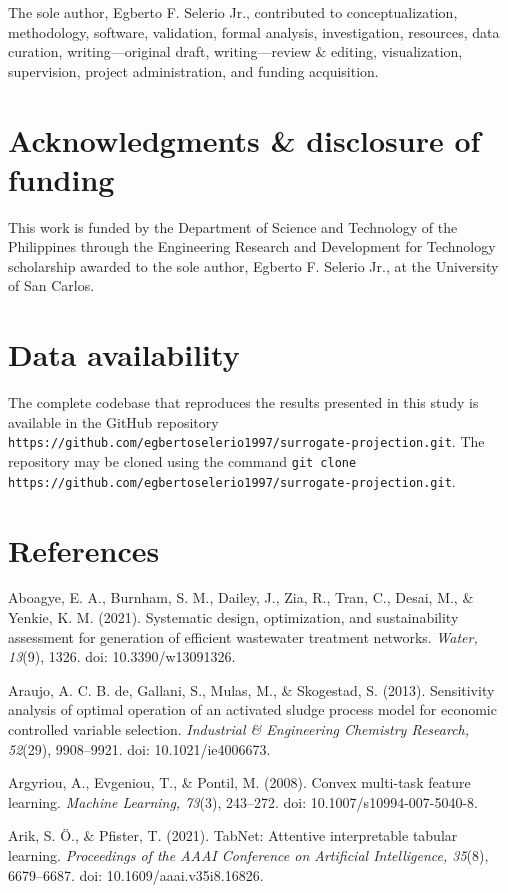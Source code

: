 \documentclass[a4paper,fleqn]{cas-sc}
\begin{document}
The sole author, Egberto F. Selerio Jr., contributed to conceptualization, methodology, software, validation, formal analysis, investigation, resources, data curation, writing---original draft, writing---review \& editing, visualization, supervision, project administration, and funding acquisition.

\section*{Acknowledgments \& disclosure of funding}

This work is funded by the Department of Science and Technology of the Philippines through the Engineering Research and Development for Technology scholarship awarded to the sole author, Egberto F. Selerio Jr., at the University of San Carlos.

\section*{Data availability}

The complete codebase that reproduces the results presented in this study is available in the GitHub repository \texttt{https://github.com/egbertoselerio1997/surrogate-projection.git}. The repository may be cloned using the command \texttt{git clone https://github.com/egbertoselerio1997/surrogate-projection.git}.

\section*{References}

\noindent Aboagye, E. A., Burnham, S. M., Dailey, J., Zia, R., Tran, C., Desai, M., \& Yenkie, K. M. (2021). Systematic design, optimization, and sustainability assessment for generation of efficient wastewater treatment networks. \textit{Water, 13}(9), 1326. doi: 10.3390/w13091326.

\noindent Araujo, A. C. B. de, Gallani, S., Mulas, M., \& Skogestad, S. (2013). Sensitivity analysis of optimal operation of an activated sludge process model for economic controlled variable selection. \textit{Industrial \& Engineering Chemistry Research, 52}(29), 9908--9921. doi: 10.1021/ie4006673.

\noindent Argyriou, A., Evgeniou, T., \& Pontil, M. (2008). Convex multi-task feature learning. \textit{Machine Learning, 73}(3), 243--272. doi: 10.1007/s10994-007-5040-8.

\noindent Arik, S. \"O., \& Pfister, T. (2021). TabNet: Attentive interpretable tabular learning. \textit{Proceedings of the AAAI Conference on Artificial Intelligence, 35}(8), 6679--6687. doi: 10.1609/aaai.v35i8.16826.
\end{document}

